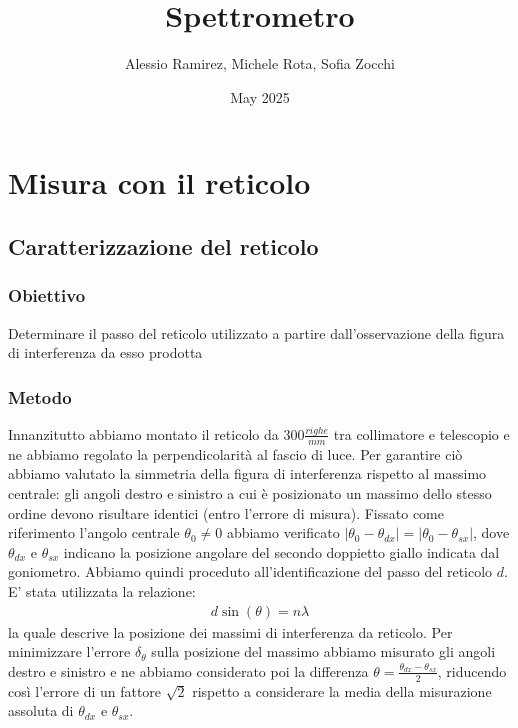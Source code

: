 \documentclass[a4paper]{article}
\title{Spettrometro}
\author{Alessio Ramirez, Michele Rota, Sofia Zocchi}
\date{May 2025}
\begin{document}
\maketitle

\section{Misura con il reticolo}

\subsection{Caratterizzazione del reticolo}
\subsubsection{Obiettivo}
Determinare il passo del reticolo utilizzato a partire dall'osservazione della figura di interferenza da esso prodotta

\subsubsection{Metodo}
Innanzitutto abbiamo montato il reticolo da $300 \frac{righe}{mm}$ tra collimatore e telescopio e ne abbiamo regolato la perpendicolarità al fascio di luce. Per garantire ciò abbiamo valutato la simmetria della figura di interferenza rispetto al massimo centrale: gli angoli destro e sinistro a cui è posizionato un massimo dello stesso ordine devono risultare identici (entro l'errore di misura). Fissato come riferimento l'angolo centrale $\theta_0 \neq 0$ abbiamo verificato $|\theta_0 -\theta_{dx}|=|\theta_0 -\theta_{sx}|$, dove $\theta_{dx}$ e $\theta_{sx}$ indicano la posizione angolare del secondo doppietto giallo indicata dal goniometro. Abbiamo quindi proceduto all'identificazione del passo del reticolo $d$. E' stata utilizzata la relazione:
\begin{align}
 d\sin(\theta) = n\lambda
\label{eq:massimi reticolo}
\end{align}
la quale descrive la posizione dei massimi di interferenza da reticolo. 
Per minimizzare l'errore $\delta_{\theta}$ sulla posizione del massimo abbiamo misurato gli angoli destro e sinistro e ne abbiamo considerato poi la differenza $\theta = \frac{\theta_{dx}-\theta_{sx}}{2}$, riducendo così l'errore di un fattore $\sqrt{2}$ rispetto a considerare la media della misurazione assoluta di $\theta_{dx}$ e $\theta_{sx}$. 
\end{document}
